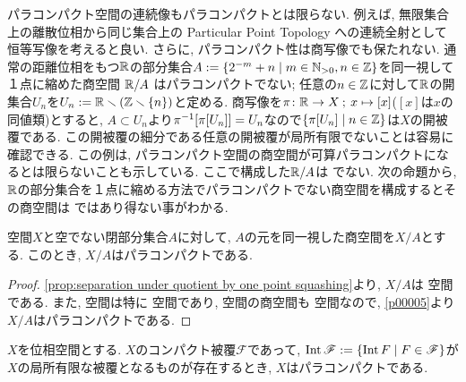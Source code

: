 \documentclass[uplatex, dvipdfmx, a4paper, 12pt, class=jsbook, crop=false]{standalone}
\begin{document}
パラコンパクト空間の連続像もパラコンパクトとは限らない.
例えば, 無限集合上の離散位相から同じ集合上の Particular Point Topology への連続全射として恒等写像を考えると良い.
さらに, パラコンパクト性は商写像でも保たれない.
通常の距離位相をもつ$ \mathbb{R} $の部分集合$ A \defeq \setcomp{2^{-m}+n}{m \in \N_{>0}, n \in \Z} $を同一視して１点に縮めた商空間
$ \mathbb{R} / A $ はパラコンパクトでない; 任意の$ n \in \mathbb{Z} $に対して$ \mathbb{R} $の開集合$ U_n $を$ U_n \mathrel{:=} \mathbb{R} \smallsetminus (\mathbb{Z} \smallsetminus \{n\}) $と定める.
商写像を$ \pi\colon\mathbb{R}\to X\mathpunct{\: ; \:} x\mapsto[x] $($ [x] $は$ x $の同値類)とすると,
$ A \subset U_n $より$ \mapinvset{\pi}{\mapset{\pi}{U_n}}= U_n $なので$ \setcomp{\mapset{\pi}{U_n}}{n \in \Z} $は$ X $の開被覆である.
この開被覆の細分である任意の開被覆が局所有限でないことは容易に確認できる.
この例は, パラコンパクト空間の商空間が可算パラコンパクトになるとは限らないことも示している.
ここで構成した$ \mathbb{R} / A $は  でない.
次の命題から, $ \mathbb{R} $の部分集合を１点に縮める方法でパラコンパクトでない商空間を構成するとその商空間は  ではあり得ない事がわかる.

\begin{proposition}
	 \Lindelof 空間$ X $と空でない閉部分集合$ A $に対して, $ A $の元を同一視した商空間を$ X / A $とする.
	このとき, $ X / A $はパラコンパクトである.
\end{proposition}

\begin{proof}
	\cref{prop:separation under quotient by one point squashing}より,
	$ X / A $は  空間である.
	また,  空間は特に  空間であり, \Lindelof 空間の商空間も
	\Lindelof 空間なので, \cref{p00005}より$ X / A $はパラコンパクトである.
\end{proof}

\begin{proposition}
	\label{prop:existence of a compact covering whose interior is a locally finite covering>ParaCpt}
	$ X $を位相空間とする. $ X $のコンパクト被覆$\mathscr{F}$であって,
	$\topint \mathscr{F} \defeq \setcomp{\topint F}{F \in \mathscr{F}}$が$X$の局所有限な被覆となるものが存在するとき,
	$ X $はパラコンパクトである.
\end{proposition}
\end{document}
